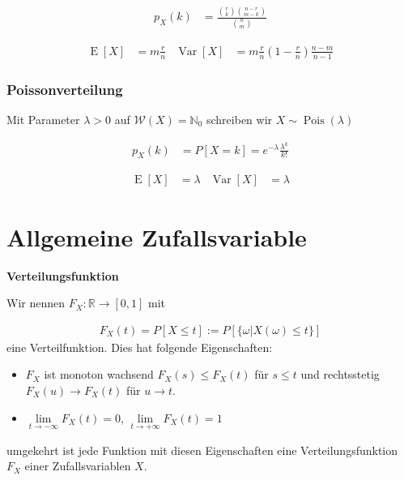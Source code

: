 \documentclass[25pt]{sciposter}
\newcommand{\R}{\mathbb{R}}
\newcommand{\N}{\mathbb{N}}
\newcommand{\W}{\mathcal{W}}
\newcommand{\Var}{\operatorname{Var}}
\newcommand{\E}{\operatorname{E}}
\newenvironment{method}[1]{\begin{mdframed}[backgroundcolor=blue!10,innertopmargin=15pt, innerbottommargin=15pt,nobreak=true]
		\textbf{#1 }
	}
	{ 
	\end{mdframed}
}
\begin{document}
\begin{multicols}{3}
		\begin{align*}
			p_X(k) &= \frac{{r\choose k} {n-r \choose m-k}}{{n \choose m}}
		\end{align*}
		
		\begin{align*}
			\E[X] &= m\frac{r}{n} & \Var[X] &= m\frac{r}{n}\left(1-\frac{r}{n}\right) \frac{n-m}{n-1}
		\end{align*}
		
		
		
		\subsubsection*{Poissonverteilung}
		
		Mit Parameter $\lambda>0$ auf $\W(X) = \N_0$ schreiben wir $X\sim {\operatorname{Pois}}(\lambda)$
		
		\begin{align*}
			p_X(k) &= P[X = k] = e^{-\lambda} \frac{\lambda^k}{k!}
		\end{align*}
		
		\begin{align*}
			\E[X] &= \lambda & \Var[X] &= \lambda
		\end{align*}
		
		
		
		
		\section{Allgemeine Zufallsvariable}
		
		
		
		\begin{method}{Verteilungsfunktion}
			Wir nennen $F_X : \R \to [0,1]$ mit 
			
			\begin{align*}
				F_X (t) = P[X\leq t]:= P[\{\omega | X(\omega) \leq t\}]
			\end{align*}
			eine Verteilfunktion. Dies hat folgende Eigenschaften:
			\begin{itemize}
				\item $F_X$ ist monoton wachsend $F_X(s)\leq F_X(t)$ für $s\leq t$ und rechtsstetig $F_X(u) \to F_X(t)$ für $u \to t$.
				\item $\lim\limits_{t\to-\infty} F_X(t) = 0$, $\lim\limits_{t\to + \infty} F_X(t) = 1$ 
			\end{itemize}
			umgekehrt ist jede Funktion mit diesen Eigenschaften eine Verteilungsfunktion $F_X$ einer Zufallsvariablen $X$.
		\end{method}
		

\end{multicols}
\end{document}
